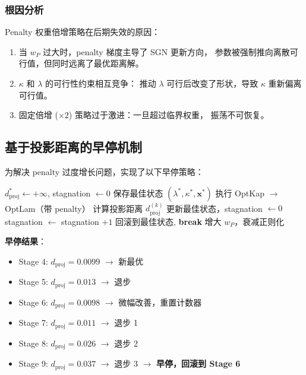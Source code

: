 \documentclass[12pt,a4paper]{article}
\begin{document}
\subsubsection{根因分析}

Penalty 权重倍增策略在后期失效的原因：
\begin{enumerate}
    \item 当 $w_P$ 过大时，penalty 梯度主导了 SGN 更新方向，
    参数被强制推向离散可行值，但同时远离了最优距离解。
    \item $\kappa$ 和 $\lambda$ 的可行性约束相互竞争：
    推动 $\lambda$ 可行后改变了形状，导致 $\kappa$ 重新偏离可行值。
    \item 固定倍增 ($\times 2$) 策略过于激进：一旦超过临界权重，
    振荡不可恢复。
\end{enumerate}

\subsection{基于投影距离的早停机制}

为解决 penalty 过度增长问题，实现了以下早停策略：

\begin{algorithm}[H]
\caption{带早停的 Penalty 逆向设计}
\begin{algorithmic}[1]
\STATE $d^*_\text{proj} \leftarrow +\infty$, stagnation $\leftarrow 0$
\STATE 保存最佳状态 $(\lambda^*, \kappa^*, \mathbf{x}^*)$
    \STATE 执行 OptKap $\to$ OptLam（带 penalty）
    \STATE 计算投影距离 $d_\text{proj}^{(k)}$
        \STATE 更新最佳状态，stagnation $\leftarrow 0$
    \ELSE
        \STATE stagnation $\leftarrow$ stagnation $+ 1$
    \ENDIF
        \STATE 回滚到最佳状态, \textbf{break}
    \ENDIF
    \STATE 增大 $w_P$，衰减正则化
\ENDFOR
\end{algorithmic}
\end{algorithm}

\textbf{早停结果}：
\begin{itemize}
    \item Stage 4: $d_\text{proj} = 0.0099$ $\to$ 新最优
    \item Stage 5: $d_\text{proj} = 0.013$ $\to$ 退步
    \item Stage 6: $d_\text{proj} = 0.0098$ $\to$ 微幅改善，重置计数器
    \item Stage 7: $d_\text{proj} = 0.011$ $\to$ 退步 1
    \item Stage 8: $d_\text{proj} = 0.026$ $\to$ 退步 2
    \item Stage 9: $d_\text{proj} = 0.037$ $\to$ 退步 3 $\to$ \textbf{早停，回滚到 Stage 6}
\end{itemize}
\end{document}
